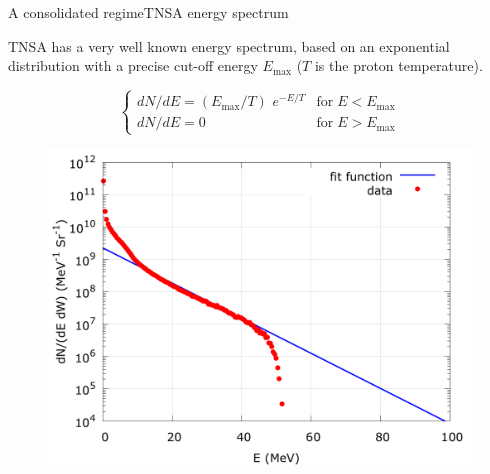 \documentclass[final]{beamer}
\def\Emax{E_{\mathrm{max}}}
\begin{document}
\begin{frame}{A consolidated regime}{TNSA energy spectrum}

TNSA has a very well known energy spectrum, based on an exponential distribution with a precise cut-off energy $\Emax$ ($T$ is the proton temperature).

\[
  \begin{cases}
    \displaystyle dN/dE = (\Emax/T)\,\, e^{-E/T} &\mathrm{for}\; E<\Emax \\
    \displaystyle dN/dE = 0                      &\mathrm{for}\; E>\Emax
  \end{cases}
\]

\begin{figure}
\centering
\includegraphics[width=0.40 \textwidth]{figs/Prpout12_Espec.png}
\end{figure}

\end{frame}
\end{document}
